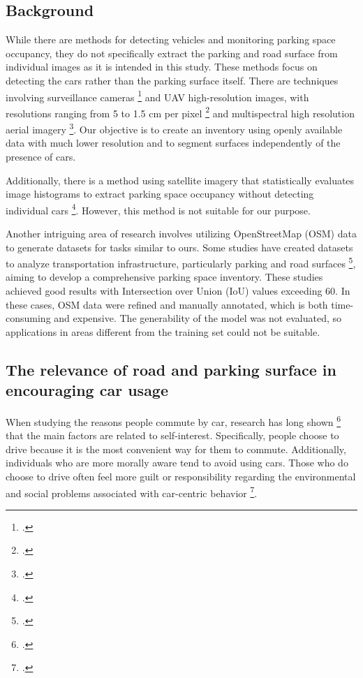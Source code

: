 \begin{refsection}
\renewcommand{\sectionnametext}{Background}
\renewcommand{\headingtextR}{\thesection. \sectionnametext}
\section{\sectionnametext}

While there are methods for detecting vehicles and monitoring parking space occupancy, they do not specifically extract the parking and road surface from individual images as it is intended in this study. These methods focus on detecting the cars rather than the parking surface itself. There are techniques involving surveillance cameras \footcite{amato_deep_2016} and UAV high-resolution images, with resolutions ranging from 5 to 1.5 cm per pixel \footcite{audebert_segment-before-detect_2017, kumar_deep_2022} and 
multispectral high resolution aerial imagery \footcite{merkle_semantic_2019}. Our objective is to create an inventory using openly available data with much lower resolution and to segment surfaces independently of the presence of cars.


Additionally, there is a method using satellite imagery that statistically evaluates image histograms to extract parking space occupancy without detecting individual cars \footcite{drouyer_parking_2020}. However, this method is not suitable for our purpose.


Another intriguing area of research involves utilizing OpenStreetMap (OSM) data to generate datasets for tasks similar to ours. Some studies have created datasets to analyze transportation infrastructure, particularly parking and road surfaces \footcite{henry_citywide_2021, hellekes_parking_2023}, aiming to develop a comprehensive parking space inventory. These studies achieved good results with Intersection over Union (IoU) values exceeding 60. In these cases, OSM data were refined and manually annotated, which is both time-consuming and expensive. The generability of the model was not 
evaluated, so applications in areas different from the training set could not be suitable.

\subsection{The relevance of road and parking surface in encouraging car usage}

When studying the reasons people commute by car, research has long shown \footcite{abrahamse_factors_2009, carse_factors_2013} that the main factors are related to self-interest. Specifically, people choose to drive because it is the most convenient way for them to commute. Additionally, individuals who are more morally aware tend to avoid using cars. Those who do choose to drive often feel more guilt or responsibility regarding the environmental and social problems associated with car-centric behavior \footcite{abrahamse_factors_2009}.



\end{refsection}
